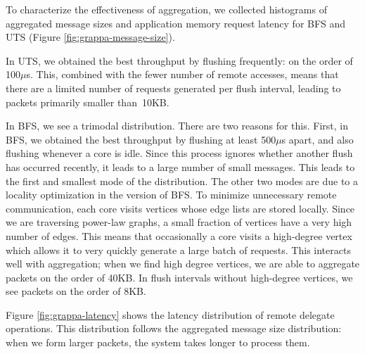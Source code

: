 To characterize the effectiveness of aggregation, we collected
histograms of aggregated message sizes and application memory request
latency for BFS and UTS (Figure \ref{fig:grappa-message-size}).



In UTS, we obtained the best throughput by flushing frequently: on the
order of 100$\mu$s. This, combined with the fewer number of remote
accesses, means that there are a limited number of requests generated
per flush interval, leading to packets primarily smaller than~10KB.

In BFS, we see a trimodal distribution. There are two reasons for
this. First, in BFS, we obtained the best throughput by flushing at
least 500$\mu$s apart, and also flushing whenever a core is
idle. Since this process ignores whether another flush has occurred
recently, it leads to a large number of small messages. This leads to
the first and smallest mode of the distribution.  The other two modes
are due to a locality optimization in the \Grappa version of BFS. To
minimize unnecessary remote communication, each core visits vertices
whose edge lists are stored locally. Since we are traversing power-law graphs, a small fraction of vertices have a very high number of edges. This means that occasionally a core visits a high-degree vertex which allows it to very quickly generate a large batch of requests. This interacts well with aggregation; when we find high degree vertices, we are able to aggregate packets on the order of 40KB. In flush intervals without high-degree vertices, we see packets on the order of 8KB.

Figure \ref{fig:grappa-latency} shows the latency distribution of
remote delegate operations. This distribution follows the aggregated
message size distribution: when we form larger packets, the system
takes longer to process them.


